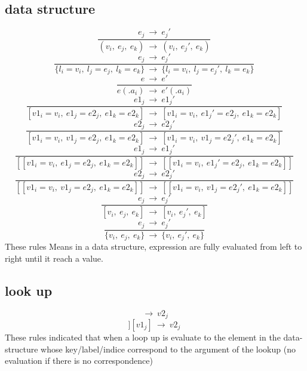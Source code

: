 \documentclass[10pt,a4paper]{article}
\begin{document}
\subsection*{ data structure }
\begin{equation}\frac{e_j\ \rightarrow \ e_j'}{(v_i,\ e_j,\ e_k)\ \rightarrow \ (v_i,\ e_j',\ e_k)}\ \tag{\ E-TUPLES\ }\end{equation}
\begin{equation}\frac{e_j\ \rightarrow \ e_j'}{\{l_i=v_i,\ l_j=e_j,\ l_k=e_k\}\ \rightarrow \ \{l_i=v_i,\ l_j=e_j',\ l_k=e_k\}}\ \tag{\ E-RECORDS\ }\end{equation}
\begin{equation}\frac{e\ \rightarrow \ e'}{e(.a_i)\ \rightarrow \ e'(.a_i)}\ \tag{\ E-ACCESS\ }\end{equation}
\begin{equation}\frac{e1_j\ \rightarrow \ e1_j'}{[v1_i=v_i,\ e1_j=e2_j,\ e1_k=e2_k]\ \rightarrow \ [v1_i=v_i,\ e1_j'=e2_j,\ e1_k=e2_k]}\ \tag{\ E-MAP1\ }\end{equation}
\begin{equation}\frac{e2_j\ \rightarrow \ e2_j'}{[v1_i=v_i,\ v1_j=e2_j,\ e1_k=e2_k]\ \rightarrow \ [v1_i=v_i,\ v1_j=e2_j',\ e1_k=e2_k]}\ \tag{\ E-MAP2\ }\end{equation}
\begin{equation}\frac{e1_j\ \rightarrow \ e1_j'}{[[v1_i=v_i,\ e1_j=e2_j,\ e1_k=e2_k]]\ \rightarrow \ [[v1_i=v_i,\ e1_j'=e2_j,\ e1_k=e2_k]]}\ \tag{\ E-BIGMAP1\ }\end{equation}
\begin{equation}\frac{e2_j\ \rightarrow \ e2_j'}{[[v1_i=v_i,\ v1_j=e2_j,\ e1_k=e2_k]]\ \rightarrow \ [[v1_i=v_i,\ v1_j=e2_j',\ e1_k=e2_k]]}\ \tag{\ E-BIGMAP2\ }\end{equation}
\begin{equation}\frac{e_j\ \rightarrow \ e_j'}{[v_i,\ e_j,\ e_k]\ \rightarrow \ [v_i,\ e_j',\ e_k]}\ \tag{\ E-LIST\ }\end{equation}
\begin{equation}\frac{e_j\ \rightarrow \ e_j'}{\{v_i,\ e_j,\ e_k\}\ \rightarrow \ \{v_i,\ e_j',\ e_k\}}\ \tag{\ E-SET\ }\end{equation}
These rules Means in a data structure, expression are fully evaluated from left to right until it reach a value.

\subsection*{ look up }
\begin{equation}[v1_i=v2_i][v1_j] \ \rightarrow \ v2_j\ \tag{\ E-LUPMAP\ }\end{equation}
\begin{equation}[[v2_i=v2_i]][v1_j] \ \rightarrow \ v2_j\ \tag{\ E-LUPBIGMAP\ }\end{equation}
These rules indicated that when a loop up is evaluate to the element in the data-structure whose key/label/indice correspond to the argument of the lookup
(no evaluation if there is no correspondence)
\end{document}
